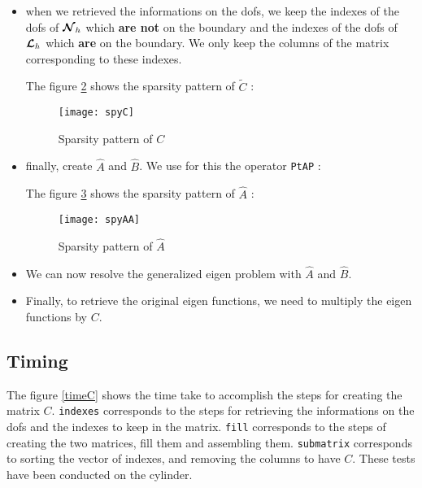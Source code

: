 \begin{itemize}
\begin{itemize}
    if the edge touch the boundary with only one vertices, the start or the end of the edge, we set only the
    corresponding column,
  \item
    if the edge doesn't touch the boundary, these line stays empty. 
  \end{itemize}
  
  The figure \ref{spyCTilde} shows the sparsity pattern of $\tilde{C}$ : 
  \begin{figure}[H]
    \centering
    \texttt{[image: spyCTilde]}
    \caption{Sparsity pattern of $\tilde{C}$}
    \label{spyCTilde}
  \end{figure}
\item
  when we retrieved the informations on the dofs, we keep the indexes of the dofs of ${\bm{\mathcal{N}}}_h$ which {\bf are not} on the boundary and the indexes of the dofs of ${\bm{\mathcal{L}}}_h$ which {\bf are} on the boundary. We only keep the columns of the matrix corresponding to these indexes.
  
  The figure \ref{spyC} shows the sparsity pattern of $\tilde{C}$ : 
  \begin{figure}[H]
    \centering
    \texttt{[image: spyC]}
    \caption{Sparsity pattern of $C$}
    \label{spyC}
  \end{figure}
\item
  finally, create $\widehat{A}$ and $\widehat{B}$. We use for this the operator \texttt{PtAP} :
  
  The figure \ref{spyAA} shows the sparsity pattern of $\widehat{A}$ : 
  \begin{figure}[H]
    \centering
    \texttt{[image: spyAA]}
    \caption{Sparsity pattern of $\widehat{A}$}
    \label{spyAA}
  \end{figure}
\item
  We can now resolve the generalized eigen problem with $\widehat{A}$ and $\widehat{B}$.
\item
  Finally, to retrieve the original eigen functions, we need to multiply the eigen functions by $C$.
  
\end{itemize}

\subsection{Timing}

The figure \ref{timeC} shows the time take to accomplish the steps for creating the matrix $C$. \texttt{indexes} corresponds to the steps for retrieving the informations on the dofs and the indexes to keep in the matrix. \texttt{fill} corresponds to the steps of creating the two matrices, fill them and assembling them. \texttt{submatrix} corresponds to sorting the vector of indexes, and removing the columns to have $C$. These tests have been conducted on the cylinder.\\

